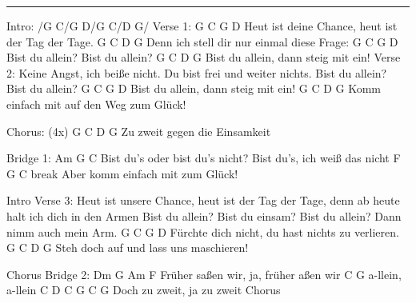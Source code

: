 \noindent\rule{\columnwidth}{1pt}

\begin{lstsong}
Intro: /G C/G D/G C/D G/
Verse 1:
G              C                G           D
Heut ist deine Chance, heut ist der Tag der Tage.
G                  C          D     G
Denn ich stell dir nur einmal diese Frage:
G       C       G       D
Bist du allein? Bist du allein?
G       C            D         G
Bist du allein, dann steig mit ein!
Verse 2:
Keine Angst, ich beiße nicht.
Du bist frei und weiter nichts.
Bist du allein? Bist du allein?
G       C            G         D
Bist du allein, dann steig mit ein!
G            C           D       G
Komm einfach mit auf den Weg zum Glück!

Chorus: (4x)
G  C               D     G
Zu zweit gegen die Einsamkeit

Bridge 1:
Am             G         C
Bist du's oder bist du's nicht?
Bist du's, ich weiß das nicht
     F            G       C    break
Aber komm einfach mit zum Glück!

Intro
Verse 3:
Heut ist unsere Chance, heut ist der Tag der Tage,
denn ab heute halt ich dich in den Armen
Bist du allein? Bist du einsam?
Bist du allein? Dann nimm auch mein Arm.
G             C             G           D
Fürchte dich nicht, du hast nichts zu verlieren.
G          C      D         G
Steh doch auf und lass uns maschieren!

Chorus
Bridge 2:
Dm           G        Am          F
Früher saßen wir, ja, früher aßen wir
  C        G
a-llein, a-llein
     C  D         C   G    C G
Doch zu zweit, ja zu zweit
Chorus
\end{lstsong}
\newpage



